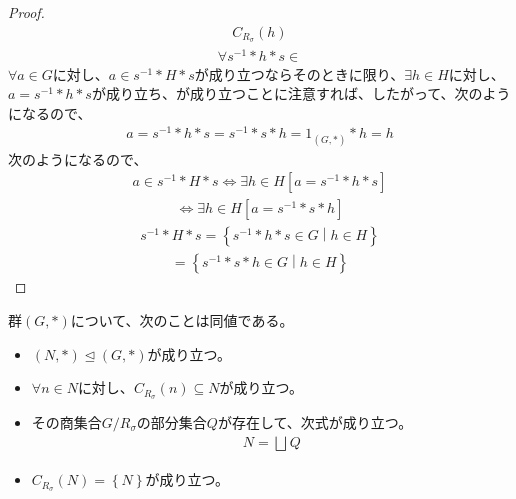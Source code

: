 \documentclass[dvipdfmx]{jsarticle}
\begin{document}
\begin{proof}
\begin{align*}
C_{R_{\sigma}}(h)
\end{align*}
\begin{align*}
\forall s^{- 1}*h*s \in
\end{align*}
$\forall a \in G$に対し、$a \in s^{- 1}*H*s$が成り立つならそのときに限り、$\exists h \in H$に対し、$a = s^{- 1}*h*s$が成り立ち、が成り立つことに注意すれば、したがって、次のようになるので、
\begin{align*}
a = s^{- 1}*h*s = s^{- 1}*s*h = 1_{(G,*)}*h = h
\end{align*}
次のようになるので、
\begin{align*}
a \in s^{- 1}*H*s \Leftrightarrow \exists h \in H\left\lbrack a = s^{- 1}*h*s \right\rbrack
\end{align*}
\begin{align*}
\Leftrightarrow \exists h \in H\left\lbrack a = s^{- 1}*s*h \right\rbrack
\end{align*}
\begin{align*}
s^{- 1}*H*s = \left\{ s^{- 1}*h*s \in G \middle| h \in H \right\}
\end{align*}
\begin{align*}
= \left\{ s^{- 1}*s*h \in G \middle| h \in H \right\}
\end{align*}
\end{proof}
\begin{thm}\label{3.1.3.12}
群$(G,*)$について、次のことは同値である。
\begin{itemize}
\item
  $(N,*) \trianglelefteq (G,*)$が成り立つ。
\item
  $\forall n \in N$に対し、$C_{R_{\sigma}}(n) \subseteq N$が成り立つ。
\item
  その商集合${G}/{R_{\sigma}}$の部分集合$Q$が存在して、次式が成り立つ。
\begin{align*}
N = \bigsqcup_{} Q
\end{align*}
\item
  $C_{R_{\sigma}}(N) = \left\{ N \right\}$が成り立つ。
\end{itemize}
\end{thm}
\end{document}
